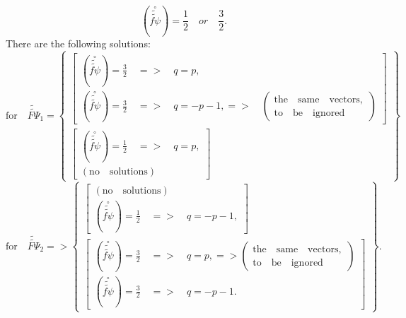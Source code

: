 \documentclass{article}
\begin{document}
\begin{equation*}
\left( \overset{\circ }{\widetilde{\widetilde{f\psi }}}\right) =\frac{1}{2}%
\quad or\quad \frac{3}{2}.
\end{equation*}
There are the following solutions:
\begin{equation*}
\mathrm{for}\quad \widetilde{\widetilde{F\Psi }}_{1}=\left\{
\begin{array}{c}
\left[
\begin{array}{c}
\left( \overset{\circ }{\widetilde{\widetilde{f\psi }}}\right) =\frac{3}{2}%
\quad =>\quad q=p, \\
\left( \overset{\circ }{\widetilde{\widetilde{f\psi }}}\right) =\frac{3}{2}%
\quad =>\quad q=-p-1,=>\quad \left(
\begin{array}{c}
\mathrm{the\quad same\quad vectors,} \\
\mathrm{to\quad be\quad ignored}
\end{array}
\right)
\end{array}
\right] \\
\left[
\begin{array}{c}
\left( \overset{\circ }{\widetilde{\widetilde{f\psi }}}\right) =\frac{1}{2}%
\quad =>\quad q=p, \\
\left( \mathrm{no\quad solutions}\right)
\end{array}
\right]
\end{array}
\right\}
\end{equation*}
\begin{equation*}
\mathrm{for}\quad \widetilde{\widetilde{F\Psi }}_{2}=>\left\{
\begin{array}{c}
\left[
\begin{array}{c}
\left( \mathrm{no\quad solutions}\right) \\
\left( \overset{\circ }{\widetilde{\widetilde{f\psi }}}\right) =\frac{1}{2}%
\quad =>\quad q=-p-1,
\end{array}
\right] \\
\left[
\begin{array}{c}
\left( \overset{\circ }{\widetilde{\widetilde{f\psi }}}\right) =\frac{3}{2}%
\quad =>\quad q=p,=>\left(
\begin{array}{c}
\mathrm{the\quad same\quad vectors,} \\
\mathrm{to\quad be\quad ignored}
\end{array}
\right) \\
\left( \overset{\circ }{\widetilde{\widetilde{f\psi }}}\right) =\frac{3}{2}%
\quad =>\quad q=-p-1.
\end{array}
\right]
\end{array}
\right\} .
\end{equation*}
\end{document}
